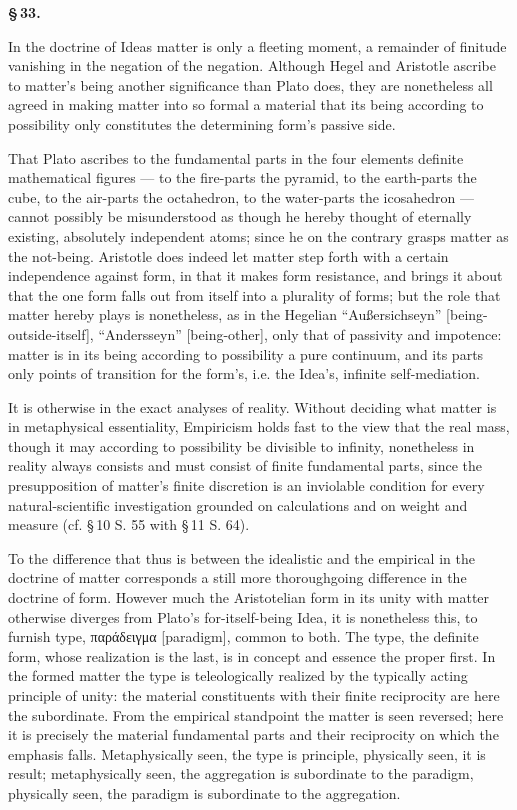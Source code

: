 \documentclass[12pt]{book}
\begin{document}
\begin{center}{\bfseries \S\,33.}\end{center}

In the doctrine of Ideas matter is only a fleeting moment, a remainder of finitude vanishing in the
negation of the negation. Although Hegel and Aristotle ascribe to matter's being another significance
than Plato does, they are nonetheless all agreed in making matter into so formal a material that its
being according to possibility only constitutes the determining form's passive side.

That Plato ascribes to the fundamental parts in the four elements definite mathematical figures --- to
the fire-parts the pyramid, to the earth-parts the cube, to the air-parts the octahedron, to the
water-parts the icosahedron --- cannot possibly be misunderstood as though he hereby
thought of eternally existing, absolutely independent atoms; since he on the contrary grasps matter as
the not-being. Aristotle does indeed let matter step forth with a certain independence against form, in
that it makes form resistance, and brings it about that the one form falls out from itself into a
plurality of forms; but the role that matter hereby plays is nonetheless, as in the Hegelian
``Außersichseyn'' [being-outside-itself], ``Andersseyn'' [being-other], only that of passivity and
impotence: matter is in its being according to possibility a pure continuum, and its parts only
points of transition for the form's, i.e. the Idea's, infinite self-mediation.

It is otherwise in the exact analyses of reality. Without deciding what matter is in metaphysical
essentiality, Empiricism holds fast to the view that the real mass, though it may according to
possibility be divisible to infinity, nonetheless in reality always consists and must consist of finite
fundamental parts, since the presupposition of matter's finite discretion is an inviolable condition for
every natural-scientific investigation grounded on calculations and on weight and measure (cf.
\S\,10 S. 55 with \S\,11 S. 64).

To the difference that thus is between the idealistic and the empirical in the doctrine of matter
corresponds a still more thoroughgoing difference in the doctrine of form. However much the Aristotelian
form in its unity with matter otherwise diverges from Plato's for-itself-being Idea, it is nonetheless
this, to furnish type, παράδειγμα [paradigm], common to both. The type, the definite form, whose
realization is the last, is in concept and essence the proper first. In the formed matter the type is
teleologically realized by the typically acting principle of unity: the material constituents with
their finite reciprocity are here the subordinate. From the empirical standpoint the matter is seen
reversed; here it is precisely the material fundamental parts and their reciprocity on which the
emphasis falls. Metaphysically seen, the type is principle, physically seen, it is result;
metaphysically
seen, the aggregation is subordinate to the paradigm, physically seen, the paradigm is subordinate to
the aggregation.
\end{document}
